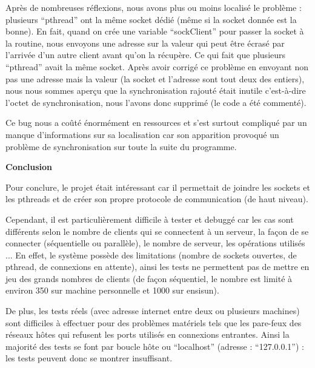\documentclass[a4paper,12pt]{article}
\begin{document}
Après de nombreuses réflexions, nous avons plus ou moins localisé le problème : plusieurs ``pthread'' ont la même socket dédié (même si la socket donnée est la bonne). En fait, quand on crée une variable ``sockClient'' pour passer la socket à la routine, nous envoyons une adresse sur la valeur qui peut être écrasé par l'arrivée d'un autre client avant qu'on la récupère. Ce qui fait que plusieurs ``pthread'' avait la même socket. Après avoir corrigé ce problème en envoyant non pas une adresse mais la valeur (la socket et l'adresse sont tout deux des entiers), nous nous sommes aperçu que la synchronisation rajouté était inutile c'est-à-dire l'octet de synchronisation, nous l'avons donc supprimé (le code a été commenté).

Ce bug nous a coûté énormément en ressources et s'est surtout compliqué par un manque d'informations sur sa localisation car son apparition provoqué un problème de synchronisation sur toute la suite du programme.


\vspace{0.5cm}
\large{\bf Conclusion} \normalsize

Pour conclure, le projet était intéressant car il permettait de joindre les sockets et les pthreads et de créer son propre protocole de communication (de haut niveau). 

Cependant, il est particulièrement difficile à tester et debuggé car les cas sont différents selon le nombre de clients qui se connectent à un serveur, la façon de se connecter (séquentielle ou parallèle), le nombre de serveur, les opérations utilisés ... En effet, le système possède des limitations (nombre de sockets ouvertes, de pthread, de connexions en attente), ainsi  les tests ne permettent pas de mettre en jeu des grands nombres de clients (de façon séquentiel, le nombre est limité à environ 350 sur machine personnelle et 1000 sur ensisun). 

De plus, les tests réels (avec adresse internet entre deux ou plusieurs machines) sont difficiles à effectuer pour des problèmes matériels tels que les pare-feux des réseaux hôtes qui refusent les ports utilisés en connexions entrantes. Ainsi la majorité des tests se font par boucle hôte ou ``localhost'' (adresse : ``127.0.0.1'') : les tests peuvent donc se montrer insuffisant.
\end{document}
